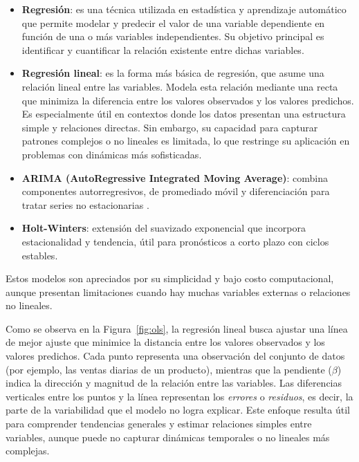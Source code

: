 \begin{itemize}

    \item \textbf{Regresión}: es una técnica utilizada en estadística y aprendizaje automático que permite modelar y predecir el valor de una variable dependiente en función de una o más variables independientes. Su objetivo principal es identificar y cuantificar la relación existente entre dichas variables.

    \item \textbf{Regresión lineal}: es la forma más básica de regresión, que asume una relación lineal entre las variables. Modela esta relación mediante una recta que minimiza la diferencia entre los valores observados y los valores predichos. Es especialmente útil en contextos donde los datos presentan una estructura simple y relaciones directas. Sin embargo, su capacidad para capturar patrones complejos o no lineales es limitada, lo que restringe su aplicación en problemas con dinámicas más sofisticadas.
    
    \item \textbf{ARIMA (AutoRegressive Integrated Moving Average)}: combina componentes autorregresivos, de promediado móvil y diferenciación para tratar series no estacionarias \parencite{box2015}.
    
    \item \textbf{Holt-Winters}: extensión del suavizado exponencial que incorpora estacionalidad y tendencia, útil para pronósticos a corto plazo con ciclos estables.
\end{itemize}

Estos modelos son apreciados por su simplicidad y bajo costo computacional, aunque presentan limitaciones cuando hay muchas variables externas o relaciones no lineales.


Como se observa en la Figura~\ref{fig:ols}, la regresión lineal busca ajustar una línea de mejor ajuste que minimice la distancia entre los valores observados y los valores predichos. 
Cada punto representa una observación del conjunto de datos (por ejemplo, las ventas diarias de un producto), mientras que la pendiente (\(\beta\)) indica la dirección y magnitud de la relación entre las variables. 
Las diferencias verticales entre los puntos y la línea representan los \textit{errores} o \textit{residuos}, es decir, la parte de la variabilidad que el modelo no logra explicar. 
Este enfoque resulta útil para comprender tendencias generales y estimar relaciones simples entre variables, aunque puede no capturar dinámicas temporales o no lineales más complejas.



